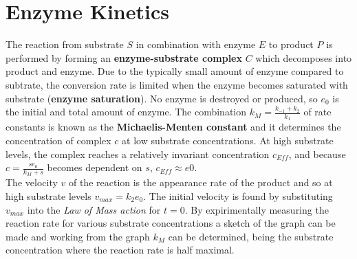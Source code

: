 \documentclass{article}
\begin{document}
	\section{Enzyme Kinetics}
		The reaction from substrate $S$ in combination with enzyme $E$ to product $P$ is performed by forming an \textbf{enzyme-substrate complex} $C$ which decomposes into product and enzyme. Due to the typically small amount of enzyme compared to subtrate, the conversion rate is limited when the enzyme becomes saturated with substrate (\textbf{enzyme saturation}). No enzyme is destroyed or produced, so $e_0$ is the initial and total amount of enzyme. The combination $k_M = \frac{k_{-1} + k_2}{k_1}$ of rate constants is known as the \textbf{Michaelis-Menten constant} and it determines the concentration of complex $c$ at low substrate concentrations. At high substrate levels, the complex reaches a relatively invariant concentration $c_{Eff}$, and because $c = \frac{se_0}{k_M + s}$ becomes dependent on $s$, $c_{Eff} \approx e0$.\\
		The velocity $v$ of the reaction is the appearance rate of the product and so at high substrate levels $v_{max} = k_2e_0$. The initial velocity is found by substituting $v_{max}$ into the \emph{Law of Mass action} for $t = 0$. By expirimentally measuring the reaction rate for various substrate concentrations a sketch of the graph can be made and working from the graph $k_M$ can be determined, being the substrate concentration where the reaction rate is half maximal.
\end{document}
